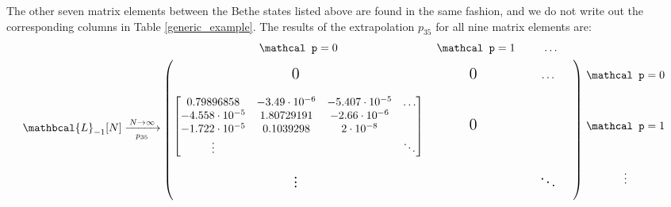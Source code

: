 \documentclass[a4paper,10pt]{article}
\newcommand{\linnea}[1]{$\framebox{\tiny L}$\ \textbf{\texttt{{\color{red}\footnotesize#1}}}}
\newcommand{\jesper}[1]{$\framebox{\tiny J}$\ \textbf{\texttt{{\color{cyan}\footnotesize#1}}}}
\newcommand{\Pscaled}{{\mathcal p}}
\newcommand{\LnMat}[1]{\mathbcal{L}_{#1}}
\begin{document}
The other seven matrix elements between the Bethe states listed above are found in the same fashion, and we do not write out the corresponding columns in Table \ref{generic_example}. The results of the extrapolation $p_{35}$ for all nine matrix elements are:
%
%
\begin{equation}\label{spinrep_example}
\LnMat{-1}[N] \xrightarrow[p_{35}]{\, N\to\infty \,} \;
\begin{blockarray}{cccc}
 \Pscaled=0 & \Pscaled=1  & \hdots &   \\
\begin{block}{(ccc)c}
\begin{matrix}&&\\&\text{\Large{0}}&\\&&\end{matrix} &  \begin{matrix}&&\\&\text{\Large{0}}&\\&&\end{matrix} & \begin{matrix}&&\\& \Large{\hdots}&\\&&\end{matrix}  &  \Pscaled=0 \\
\begin{bmatrix*}[c]%
   0.79896858      & -3.49\cdot 10^{-6}  &  -5.407\cdot 10^{-5}  & \hdots \\
  -4.558\cdot 10^{-5}   & 1.80729191     &-2.66\cdot 10^{-6}     &\\
  -1.722\cdot 10^{-5}   &  0.1039298     & 2\cdot 10^{-8}   &\\
\vdots &&&\ddots 
\end{bmatrix*} & \begin{matrix}&&\\&\text{\Large{0}}&\\&&\end{matrix} &  &  \Pscaled=1  \\
\begin{matrix}&&\\&\Large{\vdots}&\\&&\end{matrix} &   &    \begin{matrix}&&\\&\Large{\ddots}&\\&&\end{matrix} &  \vdots  \\
\end{block}
\end{blockarray}
\end{equation}
\end{document}
